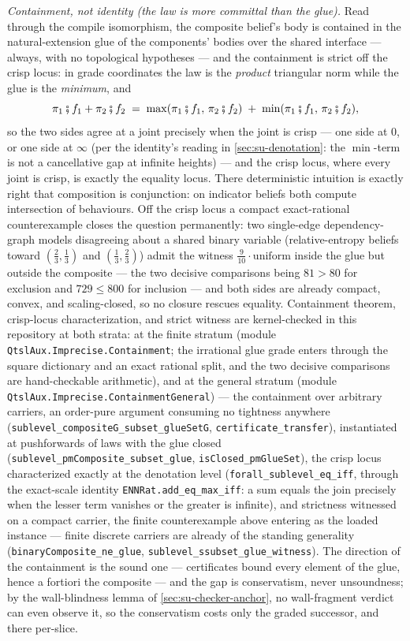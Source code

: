 \emph{Containment, not identity (the law is more committal than the
glue).} Read through the compile isomorphism, the composite
belief's body is contained in the natural-extension glue of the
components' bodies over the shared interface --- always, with no
topological hypotheses --- and the containment is strict off the
crisp locus: in grade coordinates the law is the \emph{product}
triangular norm while the glue is the \emph{minimum}, and
\[
  \pi_1 \fatsemi f_1 + \pi_2 \fatsemi f_2
  \;=\; \max(\pi_1 \fatsemi f_1,\, \pi_2 \fatsemi f_2)
  \;+\; \min(\pi_1 \fatsemi f_1,\, \pi_2 \fatsemi f_2),
\]
so the two sides agree at a joint precisely when the joint is crisp
--- one side at $0$, or one side at $\infty$ (per the identity's
reading in \autoref{sec:su-denotation}: the $\min$-term is not a
cancellative gap at infinite heights) --- and the crisp locus, where
every joint is crisp, is exactly the equality locus. There
deterministic intuition is exactly right that composition is
conjunction: on indicator beliefs both compute intersection of
behaviours. Off the crisp locus a compact
exact-rational counterexample closes the question permanently: two
single-edge dependency-graph models disagreeing about a shared
binary variable (relative-entropy beliefs toward
$(\tfrac23, \tfrac13)$ and $(\tfrac13, \tfrac23)$) admit the
witness $\tfrac{9}{10}\cdot\mathrm{uniform}$ inside the glue but
outside the composite --- the two decisive comparisons being
$81 > 80$ for exclusion and $729 \le 800$ for inclusion --- and
both sides are already compact, convex, and scaling-closed, so no
closure rescues equality. Containment theorem, crisp-locus
characterization, and strict witness are kernel-checked in this
repository at both strata: at the finite stratum (module
\texttt{QtslAux.Imprecise.Containment}; the irrational glue grade
enters through the square dictionary and an exact rational split,
and the two decisive comparisons are hand-checkable arithmetic),
and at the general stratum (module
\texttt{QtslAux.Imprecise.ContainmentGeneral}) --- the containment
over arbitrary carriers, an order-pure argument consuming no
tightness anywhere
(\texttt{sublevel\_compositeG\_subset\_glueSetG},
\texttt{certificate\_transfer}), instantiated at pushforwards of
laws with the glue closed
(\texttt{sublevel\_pmComposite\_subset\_glue},
\texttt{isClosed\_pmGlueSet}), the crisp locus characterized
exactly at the denotation level
(\texttt{forall\_sublevel\_eq\_iff}, through the exact-scale
identity \texttt{ENNRat.add\_eq\_max\_iff}: a sum equals the join
precisely when the lesser term vanishes or the greater is
infinite), and strictness witnessed on a compact carrier, the
finite counterexample above entering as the loaded instance ---
finite discrete carriers are already of the standing generality
(\texttt{binaryComposite\_ne\_glue},
\texttt{sublevel\_ssubset\_glue\_witness}). The direction of the containment is the
sound one --- certificates bound every element of the glue, hence a
fortiori the composite --- and the gap is conservatism, never
unsoundness; by the wall-blindness lemma of
\autoref{sec:su-checker-anchor}, no wall-fragment verdict can
even
observe it, so the conservatism costs only the graded successor,
and there per-slice.

